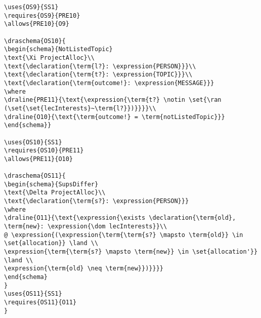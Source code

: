 \begin{verbatim}
\uses{OS9}{SS1}
\requires{OS9}{PRE10}
\allows{PRE10}{O9}

\draschema{OS10}{
\begin{schema}{NotListedTopic}
\text{\Xi ProjectAlloc}\\
\text{\declaration{\term{l?}: \expression{PERSON}}}\\
\text{\declaration{\term{t?}: \expression{TOPIC}}}\\
\text{\declaration{\term{outcome!}: \expression{MESSAGE}}}
\where
\draline{PRE11}{\text{\expression{\term{t?} \notin \set{\ran (\set{\set{lecInterests}~\term{l?}})}}}}\\
\draline{O10}{\text{\term{outcome!} = \term{notListedTopic}}}
\end{schema}}

\uses{OS10}{SS1}
\requires{OS10}{PRE11}
\allows{PRE11}{O10}

\draschema{OS11}{
\begin{schema}{SupsDiffer}
\text{\Delta ProjectAlloc}\\
\text{\declaration{\term{s?}: \expression{PERSON}}}
\where
\draline{O11}{\text{\expression{\exists \declaration{\term{old}, \term{new}: \expression{\dom lecInterests}}\\
@ \expression{(\expression{\term{\term{s?} \mapsto \term{old}} \in \set{allocation}} \land \\
\expression{\term{\term{s?} \mapsto \term{new}} \in \set{allocation'}} \land \\
\expression{\term{old} \neq \term{new}})}}}}
\end{schema}
}
\uses{OS11}{SS1}
\requires{OS11}{O11}
}

\end{verbatim}